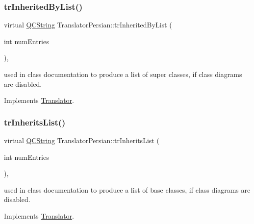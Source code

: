 \mbox{\label{class_translator_persian_a29b16a0819f20f9d5c4afa710a45b98b}} 
\subsubsection{\texorpdfstring{trInheritedByList()}{trInheritedByList()}}
{\footnotesize\ttfamily virtual \mbox{\hyperlink{class_q_c_string}{Q\+C\+String}} Translator\+Persian\+::tr\+Inherited\+By\+List (\begin{DoxyParamCaption}\item[{int}]{num\+Entries }\end{DoxyParamCaption})\hspace{0.3cm}{\ttfamily [inline]}, {\ttfamily [virtual]}}

used in class documentation to produce a list of super classes, if class diagrams are disabled. 

Implements \mbox{\hyperlink{class_translator}{Translator}}.

\mbox{\label{class_translator_persian_acb93ef6516fa3a30171b96156dbba4ca}} 
\subsubsection{\texorpdfstring{trInheritsList()}{trInheritsList()}}
{\footnotesize\ttfamily virtual \mbox{\hyperlink{class_q_c_string}{Q\+C\+String}} Translator\+Persian\+::tr\+Inherits\+List (\begin{DoxyParamCaption}\item[{int}]{num\+Entries }\end{DoxyParamCaption})\hspace{0.3cm}{\ttfamily [inline]}, {\ttfamily [virtual]}}

used in class documentation to produce a list of base classes, if class diagrams are disabled. 

Implements \mbox{\hyperlink{class_translator}{Translator}}.

\mbox{\label{class_translator_persian_a7313674664f323707e3e70ca1b5b008d}} 
